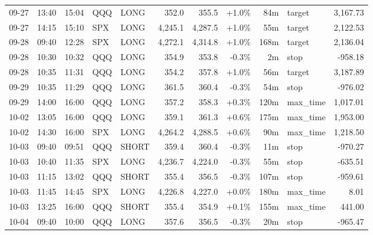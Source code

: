\documentclass[11pt,a4paper,twoside]{article}
\begin{document}
\begin{center}
\begin{longtable}{>{\color{txtmain}}l l l l l r r r r >{\color{txtmain}}l r}
09-27 & 13:40 & 15:04 & QQQ & LONG & 352.0 & 355.5 & \textcolor{wingreen}{+1.0\%} & 84m & target & \textcolor{wingreen}{3,167.73} \\
09-27 & 14:15 & 15:10 & SPX & LONG & 4,245.1 & 4,287.5 & \textcolor{wingreen}{+1.0\%} & 55m & target & \textcolor{wingreen}{2,122.53} \\
09-28 & 09:40 & 12:28 & SPX & LONG & 4,272.1 & 4,314.8 & \textcolor{wingreen}{+1.0\%} & 168m & target & \textcolor{wingreen}{2,136.04} \\
09-28 & 10:30 & 10:32 & QQQ & LONG & 354.9 & 353.8 & \textcolor{lossred}{-0.3\%} & 2m & stop & \textcolor{lossred}{-958.18} \\
09-28 & 10:35 & 11:31 & QQQ & LONG & 354.2 & 357.8 & \textcolor{wingreen}{+1.0\%} & 56m & target & \textcolor{wingreen}{3,187.89} \\
09-29 & 10:35 & 11:29 & QQQ & LONG & 361.5 & 360.4 & \textcolor{lossred}{-0.3\%} & 54m & stop & \textcolor{lossred}{-976.02} \\
09-29 & 14:00 & 16:00 & QQQ & LONG & 357.2 & 358.3 & \textcolor{wingreen}{+0.3\%} & 120m & max\_time & \textcolor{wingreen}{1,017.01} \\
10-02 & 13:05 & 16:00 & QQQ & LONG & 359.1 & 361.3 & \textcolor{wingreen}{+0.6\%} & 175m & max\_time & \textcolor{wingreen}{1,953.00} \\
10-02 & 14:30 & 16:00 & SPX & LONG & 4,264.2 & 4,288.5 & \textcolor{wingreen}{+0.6\%} & 90m & max\_time & \textcolor{wingreen}{1,218.50} \\
10-03 & 09:40 & 09:51 & QQQ & SHORT & 359.4 & 360.4 & \textcolor{lossred}{-0.3\%} & 11m & stop & \textcolor{lossred}{-970.27} \\
10-03 & 10:40 & 11:35 & SPX & LONG & 4,236.7 & 4,224.0 & \textcolor{lossred}{-0.3\%} & 55m & stop & \textcolor{lossred}{-635.51} \\
10-03 & 11:15 & 13:02 & QQQ & SHORT & 355.4 & 356.5 & \textcolor{lossred}{-0.3\%} & 107m & stop & \textcolor{lossred}{-959.61} \\
10-03 & 11:45 & 14:45 & SPX & LONG & 4,226.8 & 4,227.0 & \textcolor{wingreen}{+0.0\%} & 180m & max\_time & \textcolor{wingreen}{8.01} \\
10-03 & 13:25 & 16:00 & QQQ & SHORT & 355.4 & 354.9 & \textcolor{wingreen}{+0.1\%} & 155m & max\_time & \textcolor{wingreen}{441.00} \\
10-04 & 09:40 & 10:00 & QQQ & LONG & 357.6 & 356.5 & \textcolor{lossred}{-0.3\%} & 20m & stop & \textcolor{lossred}{-965.47} \\

\end{longtable}
\end{center}
\end{document}
